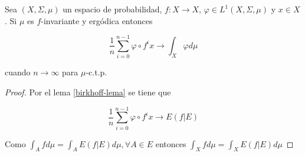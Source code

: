 \begin{teorema}\label{birkhoff_thm}
	Sea $(X,\Sigma,\mu)$ un espacio de probabilidad, $f: X \rightarrow X$, $\varphi \in L^1(X,\Sigma,\mu)$ y $x \in X$. Si $\mu$ es $f$-invariante y ergódica entonces
	
	\begin{equation}
		\frac{1}{n} \sum_{i=0}^{n-1} \varphi \circ f^i x \rightarrow \int_X \varphi d\mu
	\end{equation}
	
	cuando $n \rightarrow \infty$ para $\mu$-c.t.p.
\end{teorema}

\begin{proof}
	Por el lema \ref{birkhoff-lema} se tiene que
	
	\begin{equation}
		\frac{1}{n} \sum_{i=0}^{n-1} \varphi \circ f^i x \rightarrow E(f|E)
	\end{equation}
	
	Como $\int_A f d\mu = \int_A E(f|E) d\mu, \forall A \in E$ entonces $\int_X f d\mu = \int_X E(f|E) d\mu$
\end{proof}
